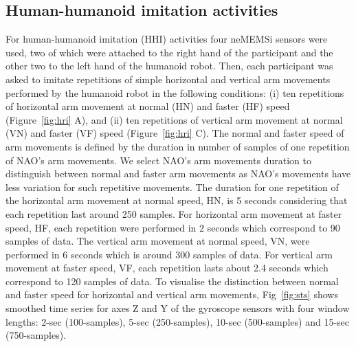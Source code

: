 \documentclass[fleqn,10pt]{wlscirep}
\begin{document}
\subsection*{Human-humanoid imitation activities}
For human-humanoid imitation (HHI) activities four neMEMSi sensors were used,
two of which were attached to the right hand of the participant and the 
other two to the left hand of the humanoid robot.
Then, each participant was asked to imitate repetitions of simple horizontal
and vertical arm movements performed by the humanoid robot in the following 
conditions:
(i) ten repetitions of horizontal arm movement at normal (HN) 
	and faster (HF) speed (Figure~\ref{fig:hri} A), and
(ii) ten repetitions of vertical arm movement at normal (VN) 
	and faster (VF) speed (Figure~\ref{fig:hri} C).
The normal and faster speed of arm movements is defined by the duration 
in number of samples of one repetition of NAO's arm movements. 
We select NAO's arm movements duration to distinguish between normal and 
faster arm movements as NAO's movements have less variation 
for such repetitive movements. 
The duration for one repetition of the horizontal 
arm movement at normal speed, HN, is 5 seconds considering 
that each repetition last around 250 samples.
For horizontal arm movement at faster speed, HF, each repetition were performed 
in 2 seconds which correspond to 90 samples of data.
The vertical arm movement at normal speed, VN, were performed  in 6 seconds 
which is around 300 samples of data. For vertical arm movement at 
faster speed, VF, each repetition lasts about 2.4 seconds which correspond 
to 120 samples of data.
To visualise the distinction between normal and faster speed for horizontal 
and vertical arm movements, Fig~\ref{fig:sts} shows smoothed time series 
for axes Z and Y of the gyroscope sensors with four window lengths: 
2-sec (100-samples), 5-sec (250-samples), 10-sec (500-samples) 
and 15-sec (750-samples).
\end{document}
